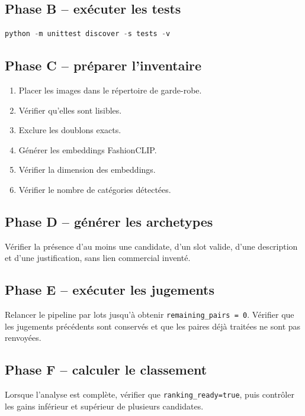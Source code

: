 \documentclass[11pt,a4paper]{article}
\begin{document}
\subsection{Phase B -- exécuter les tests}

\begin{lstlisting}[language=powershell]
python -m unittest discover -s tests -v
\end{lstlisting}

\subsection{Phase C -- préparer l'inventaire}

\begin{enumerate}[leftmargin=*]
    \item Placer les images dans le répertoire de garde-robe.
    \item Vérifier qu'elles sont lisibles.
    \item Exclure les doublons exacts.
    \item Générer les embeddings FashionCLIP.
    \item Vérifier la dimension des embeddings.
    \item Vérifier le nombre de catégories détectées.
\end{enumerate}

\subsection{Phase D -- générer les archetypes}

Vérifier la présence d'au moins une candidate, d'un slot valide, d'une
description et d'une justification, sans lien commercial inventé.

\subsection{Phase E -- exécuter les jugements}

Relancer le pipeline par lots jusqu'à obtenir
\texttt{remaining\_pairs = 0}. Vérifier que les jugements précédents sont
conservés et que les paires déjà traitées ne sont pas renvoyées.

\subsection{Phase F -- calculer le classement}

Lorsque l'analyse est complète, vérifier que
\texttt{ranking\_ready=true}, puis contrôler les gains inférieur et supérieur
de plusieurs candidates.
\end{document}
